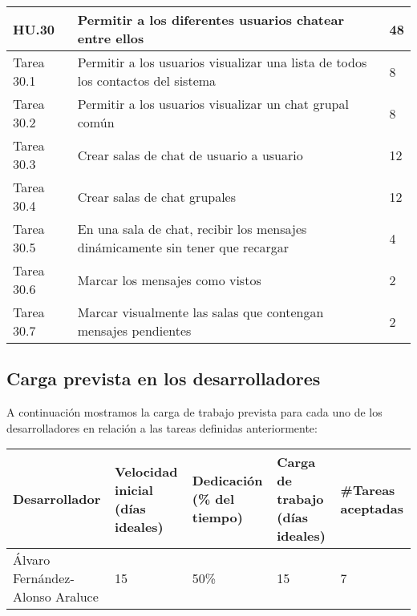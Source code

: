 \begin{table}[h]
	\centering
	\begin{tabular}{| p{2.3cm} | p{6.7cm} | p{2cm} |}
		\rowcolor[HTML]{329A9D} 
		{\color[HTML]{FFFFFF} \textbf{HU.30}} & {\color[HTML]{FFFFFF} \textbf{Permitir a los diferentes usuarios chatear entre ellos}} & {\color[HTML]{FFFFFF} \textbf{48}}  \\ \hline
		Tarea 30.1 & Permitir a los usuarios visualizar una lista de todos los contactos del sistema & 8 \\ \hline
		Tarea 30.2 & Permitir a los usuarios visualizar un chat grupal común & 8 \\ \hline
		Tarea 30.3 & Crear salas de chat de usuario a usuario & 12 \\ \hline
		Tarea 30.4 & Crear salas de chat grupales & 12 \\ \hline
		Tarea 30.5 & En una sala de chat, recibir los mensajes dinámicamente sin tener que recargar & 4 \\ \hline
		Tarea 30.6 & Marcar los mensajes como vistos & 2 \\ \hline
		Tarea 30.7 & Marcar visualmente las salas que contengan mensajes pendientes & 2 \\ \hline
	\end{tabular}
\end{table}

\subsection{Carga prevista en los desarrolladores}

A continuación mostramos la carga de trabajo prevista para cada uno de los desarrolladores en relación a las tareas definidas anteriormente:

\begin{table}[h]
	\centering
	\begin{tabular}{| p{3cm} | p{2cm} | p{2cm} | p{2cm} | p{2cm} |}
		\rowcolor[HTML]{329A9D} 
		{\color[HTML]{FFFFFF} \textbf{Desarrollador}} & {\color[HTML]{FFFFFF} \textbf{Velocidad inicial (días ideales)}} & {\color[HTML]{FFFFFF} \textbf{Dedicación (\% del tiempo)}} & {\color[HTML]{FFFFFF} \textbf{Carga de trabajo (días ideales)}} & {\color[HTML]{FFFFFF} \textbf{\#Tareas aceptadas}}  \\ \hline
		Álvaro Fernández-Alonso Araluce & 15 & 50\% & 15 & 7 \\ \hline
	\end{tabular}
\end{table}

